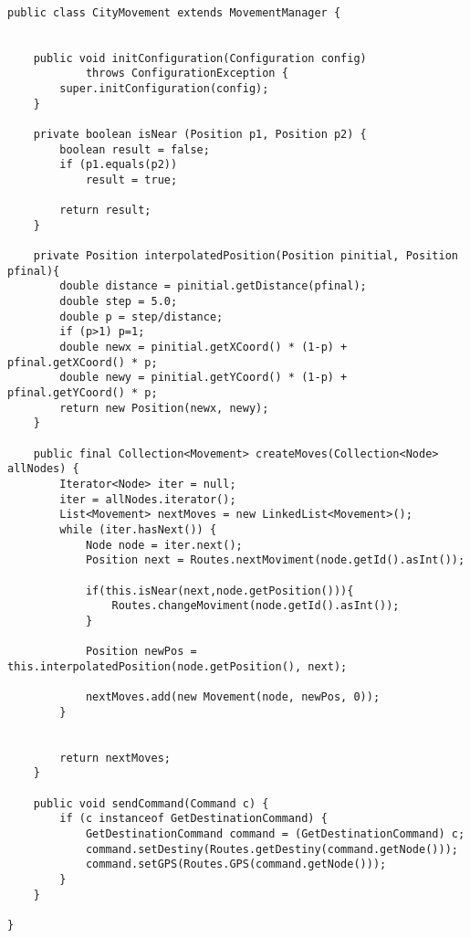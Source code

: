 \begin{lstlisting}

public class CityMovement extends MovementManager {
	
	
	public void initConfiguration(Configuration config)
			throws ConfigurationException {
		super.initConfiguration(config);
	}

	private boolean isNear (Position p1, Position p2) {
		boolean result = false;
		if (p1.equals(p2))
			result = true;
		
		return result;
	}
	
	private Position interpolatedPosition(Position pinitial, Position pfinal){
		double distance = pinitial.getDistance(pfinal);
		double step = 5.0;
		double p = step/distance;
		if (p>1) p=1;
		double newx = pinitial.getXCoord() * (1-p) + pfinal.getXCoord() * p;
		double newy = pinitial.getYCoord() * (1-p) + pfinal.getYCoord() * p;
		return new Position(newx, newy);
	}
	
	public final Collection<Movement> createMoves(Collection<Node> allNodes) {
		Iterator<Node> iter = null;
		iter = allNodes.iterator();
		List<Movement> nextMoves = new LinkedList<Movement>();
		while (iter.hasNext()) {
			Node node = iter.next();
			Position next = Routes.nextMoviment(node.getId().asInt());
			
			if(this.isNear(next,node.getPosition())){
				Routes.changeMoviment(node.getId().asInt());
			}	
			
			Position newPos = this.interpolatedPosition(node.getPosition(), next);
			
			nextMoves.add(new Movement(node, newPos, 0));
		}
		
		
		return nextMoves;
	}
	
	public void sendCommand(Command c) {
		if (c instanceof GetDestinationCommand) {
			GetDestinationCommand command = (GetDestinationCommand) c;
			command.setDestiny(Routes.getDestiny(command.getNode()));
			command.setGPS(Routes.GPS(command.getNode()));
		}
	}
	
}
\end{lstlisting}
